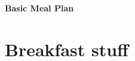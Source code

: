 \documentclass[11pt, a4paper]{article}
\begin{document}
\begin{center}
\Large{\textbf{Basic Meal Plan}}
\end{center}











\vspace{0.917 pc} %

\tableofcontents


\pagebreak

\section{Breakfast stuff}
\end{document}
